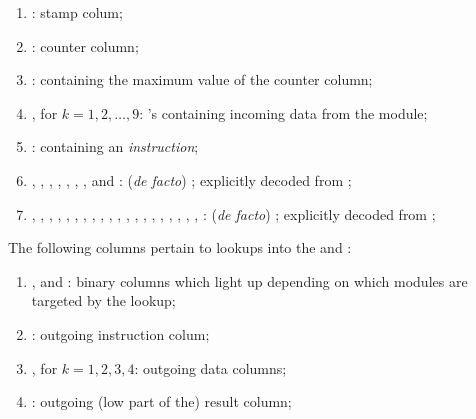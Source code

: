 \begin{enumerate}
	\item \oobStamp{}:
		stamp colum;
	\item \ct{}:
		counter column;
	\item \maxCt{}:
		\ccc{} containing the maximum value of the counter column;
	\item {}, for $k = 1, 2, \dots, 9$: \godGiven{}
		\ccc{}'s containing incoming data from the \hubMod{} module;
	\item \oobInstruction{}: \godGiven{}
		\ccc{} containing an \emph{\oobMod{} instruction};
	\item
		\oobInstIsJump{},
		\oobInstIsJumpI{},
		\oobInstIsRdc{},
		\oobInstIsCdl{},
		\oobInstIsXcall{},
		\oobInstIsCall{},
		\oobInstIsCreate{},
		\oobInstIsSstore{} and 
		\oobInstIsDeployment{}:
		(\emph{de facto}) \ccbc{}; explicitly decoded from \oobInst{};
	\item 
		\oobInstIsEcrecover{},
		\oobInstIsShaTwo{},
		\oobInstIsRipemd{},
		\oobInstIsIdentity{},
		\oobInstIsEcadd{},
		\oobInstIsEcmul{},
		\oobInstIsEcpairing{},
		\oobInstIsBlakeCds{},
		\oobInstIsBlakeParams{},
		\oobInstIsModexpCds{},
		\oobInstIsModexpXbs{},
		\oobInstIsModexpLead{},
		\oobInstIsModexpPricing{},
		\oobInstIsModexpExtract{},
		\oobInstIsBlsGOneAdd{},
		\oobInstIsBlsGOneMsm{},
		\oobInstIsBlsGTwoAdd{},
		\oobInstIsBlsGTwoMsm{},
		\oobInstIsBlsPairingCheck{},
		\oobInstIsBlsMapFpToGOne{},
		\oobInstIsBlsMapFpTwoToGTwo{}:
		(\emph{de facto}) \ccbc{}; explicitly decoded from \oobInstruction{};
\end{enumerate}
The following columns pertain to lookups into the \wcpMod{} and \addMod{}: 
\begin{enumerate}[resume]
	\item \wcpFlag{}, \addFlag{} and \modFlag{}:
		binary columns which light up depending on which modules are targeted by the lookup;
	\item \outgoingInst{}:
		outgoing instruction colum;
	\item {}, for $k = 1, 2, 3, 4$:
		outgoing data columns;
	\item \outgoingResLo{}:
		outgoing (low part of the) result column;
\end{enumerate}
